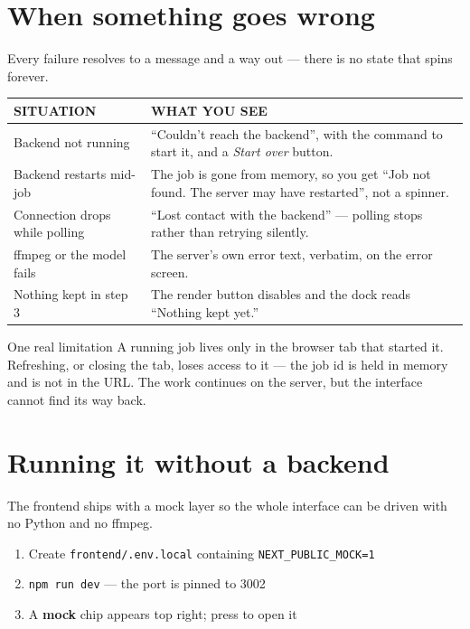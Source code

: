 \documentclass[11pt,a4paper]{article}
\newcommand{\code}[1]{\texttt{\small #1}}
\newcommand{\key}[1]{%
  \tcbox[on line, boxsep=1pt, left=3pt, right=3pt, top=1pt, bottom=1pt,
         colback=cardbg, colframe=rulec, boxrule=0.5pt, arc=2pt]
        {\ttfamily\footnotesize #1}}
\begin{document}
\section{When something goes wrong}

Every failure resolves to a message and a way out --- there is no state that
spins forever.

\begin{tabularx}{\linewidth}{@{}p{5.0cm} X@{}}
\toprule
{\sffamily\footnotesize\color{muted}SITUATION} &
{\sffamily\footnotesize\color{muted}WHAT YOU SEE} \\
\midrule
Backend not running &
\small ``Couldn't reach the backend'', with the command to start it, and a
\emph{Start over} button. \\[4pt]
Backend restarts mid-job &
\small The job is gone from memory, so you get ``Job not found. The server may
have restarted'', not a spinner. \\[4pt]
Connection drops while polling &
\small ``Lost contact with the backend'' --- polling stops rather than
retrying silently. \\[4pt]
ffmpeg or the model fails &
\small The server's own error text, verbatim, on the error screen. \\[4pt]
Nothing kept in step 3 &
\small The render button disables and the dock reads ``Nothing kept yet.'' \\
\bottomrule
\end{tabularx}

\begin{warn}{One real limitation}
A running job lives only in the browser tab that started it. Refreshing, or
closing the tab, loses access to it --- the job id is held in memory and is not
in the URL. The work continues on the server, but the interface cannot find its
way back.
\end{warn}

\section{Running it without a backend}

The frontend ships with a mock layer so the whole interface can be driven with
no Python and no ffmpeg.

\begin{enumerate}
\item Create \code{frontend/.env.local} containing \code{NEXT\_PUBLIC\_MOCK=1}
\item \code{npm run dev} --- the port is pinned to 3002
\item A \textbf{mock} chip appears top right; press \key{`} to open it
\end{enumerate}
\end{document}
